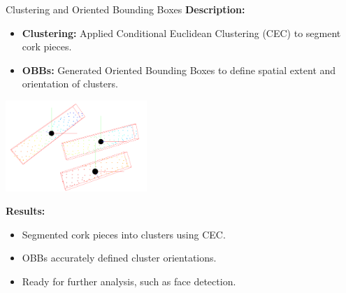 \documentclass[10pt]{beamer}
\begin{document}
	
\begin{frame}{Clustering and Oriented Bounding Boxes}
	\textbf{Description:}
	\begin{itemize}
		\item \textbf{Clustering:} Applied Conditional Euclidean Clustering (CEC) to segment cork pieces.
		\item \textbf{OBBs:} Generated Oriented Bounding Boxes to define spatial extent and orientation of clusters.
	\end{itemize}
	\begin{center}
		\includegraphics[width=0.4\textwidth]{img/bb.png} %
	\end{center}
	
	\textbf{Results:}
	\begin{itemize}
		\item Segmented cork pieces into clusters using CEC.
		\item OBBs accurately defined cluster orientations.
		\item Ready for further analysis, such as face detection.
	\end{itemize}
\end{frame}
\end{document}
